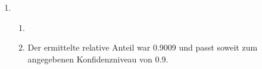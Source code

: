 \documentclass[a4paper]{scrartcl}
\newcommand{\gdw}{\Leftrightarrow}
\def \blattnr {8}
\begin{document}
\begin{enumerate}[label=\bfseries \blattnr.\arabic*]
\begin{enumerate}
                Konfidenzniveau $1 - \alpha' = \num{0.99}$:
  
                \begin{equation*}
                    1 - \alpha' = \num{0.99}
                    \gdw
                    \alpha' = \num{0.01}
                    \gdw
                    \frac{\alpha'}{2} = \num{0.005}
                    \gdw
                    1 - \frac{\alpha'}{2} = \num{0.995}
                \end{equation*}
                \begin{equation*}
                    \chi_{n-1; \nicefrac{\alpha'}{2}}^2
                    = \chi_{8; \num{0.005}}^2
                    = \num{1.34}
                    \qquad
                    \chi_{n-1; 1 - \nicefrac{\alpha'}{2}}^2
                    = \chi_{8; \num{0.995}}^2
                    = \num{21.96}
                \end{equation*}
                \begin{equation*}
                    \left[
                    \frac{(n-1)s_x^2}{\chi^2_{n-1;1-\frac{\alpha'}{2}}}
                    ,\ 
                    \frac{(n-1)s_x^2}{\chi^2_{n-1;\frac{\alpha'}{2}}}
                    \right] 
                    =
                    \left[
                    \frac{(9-1) \cdot \num{6.25}}{\num{21,96}}
                    ,\ 
                    \frac{(9-1) \cdot \num{6.25}}{\num{1,34}}
                    \right] 
                    = [\num{2,2769},\ \num{37,3134}]
                \end{equation*}
        \end{enumerate}

    \pagebreak
    \item
        \begin{enumerate}
            \item \hfill \\ 
                

            \item 
                Der ermittelte relative Anteil war \num{0.9009} und passt
                soweit zum angegebenen Konfidenzniveau von \num{0.9}.

        \end{enumerate}

\end{enumerate}
\end{document}
